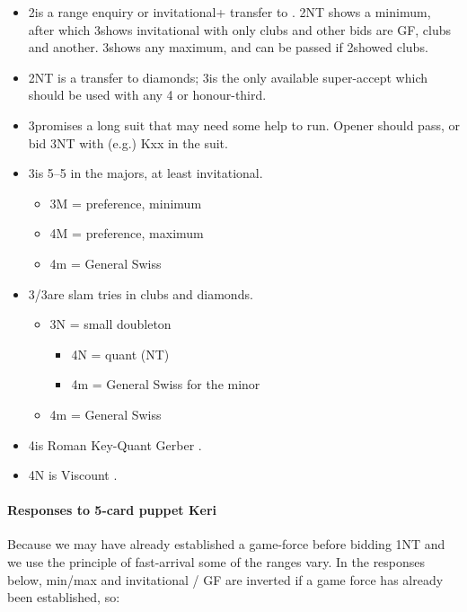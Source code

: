 \documentclass[a4paper,14pt]{extarticle}
\begin{document}
\begin{itemize}
\item 2\spades is a range enquiry or invitational+ transfer to
\clubs.  2NT shows a minimum, after which 3\clubs shows invitational
with only clubs and other bids are GF, clubs and another.  3\clubs shows
any maximum, and can be passed if 2\spades showed clubs.

\item 2NT is a transfer to diamonds; 3\clubs is the only available super-accept which 
should be used with any 4 or honour-third.

\item 3\clubs promises a long suit that may need some help to run.  Opener should
pass, or bid 3NT with (e.g.) Kxx in the suit.

\item 3\diamonds is 5--5 in the majors, at least invitational.
	\begin{itemize}
	\item 3M = preference, minimum
	\item 4M = preference, maximum
	\item 4m = General Swiss 
	\end{itemize}

\item 3\hearts/3\spades are slam tries in clubs and diamonds.
	\begin{itemize}
	\item 3N = small doubleton
		\begin{itemize}
		\item 4N = quant (NT)
		\item 4m = General Swiss  for the minor
		\end{itemize}
	\item 4m = General Swiss 
	\end{itemize}

\item 4\clubs is Roman Key-Quant Gerber .

\item 4N is Viscount .

\end{itemize}

\paragraph{Responses to 5-card puppet Keri}
\label{note:8a}

Because we may have already established a game-force before bidding 1NT and we
use the principle of fast-arrival some of the ranges vary. In the responses
below, min/max and invitational / GF are inverted if a game force has already
been established, so:
\end{document}
